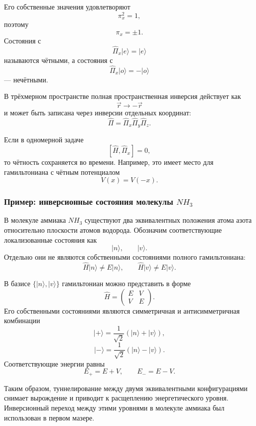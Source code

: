 \documentclass[12pt,a4paper]{article}
\begin{document}
Его собственные значения удовлетворяют
\[
    \pi_x^2=1,
\]
поэтому
\[
    \boxed{
        \pi_x=\pm1
    }.
\]
Состояния с
\[
    \hat\Pi_x|e\rangle=|e\rangle
\]
называются чётными, а состояния с
\[
    \hat\Pi_x|o\rangle=-|o\rangle
\]
--- нечётными.

В трёхмерном пространстве полная пространственная инверсия действует
как
\[
    \vec r\longrightarrow-\vec r
\]
и может быть записана через инверсии отдельных координат:
\[
    \boxed{
        \hat\Pi
        =
        \hat\Pi_x\hat\Pi_y\hat\Pi_z
    }.
\]

Если в одномерной задаче
\[
    \boxed{
        [\hat H,\hat\Pi_x]=0
    },
\]
то чётность сохраняется во времени. Например, это имеет место для
гамильтониана с чётным потенциалом
\[
    V(x)=V(-x).
\]


\subsubsection{Пример: инверсионные состояния молекулы \texorpdfstring{$NH_3$}{NH3}}

В молекуле аммиака $NH_3$ существуют два эквивалентных положения
атома азота относительно плоскости атомов водорода. Обозначим
соответствующие локализованные состояния как
\[
    |n\rangle,
    \qquad
    |v\rangle.
\]
Отдельно они не являются собственными состояниями полного
гамильтониана:
\[
    \hat H|n\rangle\neq E|n\rangle,
    \qquad
    \hat H|v\rangle\neq E|v\rangle.
\]

В базисе $\{|n\rangle,|v\rangle\}$ гамильтониан можно представить в
форме
\[
    \boxed{
        \hat H
        =
        \begin{pmatrix}
            E & V\\
            V & E
        \end{pmatrix}
    }.
\]
Его собственными состояниями являются симметричная и
антисимметричная комбинации
\[
    \boxed{
        |+\rangle
        =
        \frac{1}{\sqrt2}
        \left(
            |n\rangle+|v\rangle
        \right)
    },
\]
\[
    \boxed{
        |-\rangle
        =
        \frac{1}{\sqrt2}
        \left(
            |n\rangle-|v\rangle
        \right)
    }.
\]
Соответствующие энергии равны
\[
    \boxed{
        E_+=E+V,
        \qquad
        E_-=E-V
    }.
\]

Таким образом, туннелирование между двумя эквивалентными
конфигурациями снимает вырождение и приводит к расщеплению
энергетического уровня. Инверсионный переход между этими уровнями в
молекуле аммиака был использован в первом мазере.
\end{document}
